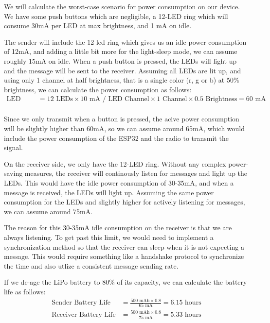 \documentclass{article}
\begin{document}
We will calculate the worst-case scenario for power consumption on our device. We have some push buttons which are negligible, a 12-LED ring which will consume 30mA per LED at max brightness, and 1 mA on idle. 

The sender will include the 12-led ring which gives us an idle power consumption of 12mA, and adding a little bit more for the light-sleep mode, we can assume roughly 15mA on idle. When a push button is pressed, the LEDs will light up and the message will be sent to the receiver. Assuming all LEDs are lit up, and using only 1 channel at half brightness, that is a single color (r, g or b) at 50\% brightness, we can calculate the power consumption as follows:
\begin{align*}
    \text{LED Power} &= 12\text{ LEDs} \times 10\text{ mA / LED Channel} \times{1 \text{ Channel}} \times 0.5\text{ Brightness} = 60\text{ mA} \\
\end{align*}

Since we only transmit when a button is pressed, the acive power consumption will be slightly higher than 60mA, so we can assume around 65mA, which would include the power consumption of the ESP32 and the radio to transmit the signal.

On the receiver side, we only have the 12-LED ring. Without any complex power-saving measures, the receiver will continously listen for messages and light up the LEDs. This would have the idle power consumption of 30-35mA, and when a message is received, the LEDs will light up. Assuming the same power consumption for the LEDs and slightly higher for actively listening for messages, we can assume around 75mA.

The reason for this 30-35mA idle consumption on the receiver is that we are always listening. To get past this limit, we would need to implement a synchronization method so that the receiver can sleep when it is not expecting a message. This would require something like a handshake protocol to synchronize the time and also utlize a consistent message sending rate.

If we de-age the LiPo battery to 80\% of its capacity, we can calculate the battery life as follows:
\begin{align*}
    \text{Sender Battery Life} &= \frac{500 \text{ mAh} \times 0.8}{65\text{ mA}} = 6.15\text{ hours} \\
    \text{Receiver Battery Life} &= \frac{500 \text{ mAh} \times 0.8}{75\text{ mA}} = 5.33\text{ hours}
\end{align*}
\end{document}

